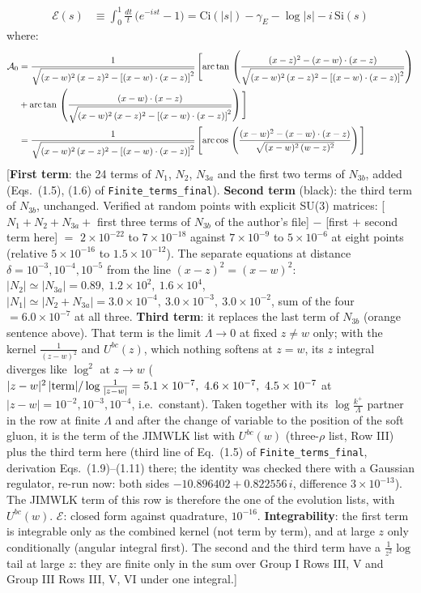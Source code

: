 \documentclass[10pt]{article}
\begin{document}
{\begin{align*}
\mathcal{E}(s) & \equiv\int_{0}^{1}\frac{dt}{t}\,\big(e^{-ist}-1\big)=\mathrm{Ci}(|s|)-\gamma_{E}-\log|s|-i\,\mathrm{Si}(s)
\end{align*}
where: \begin{align*}
\mathcal{A}_{0} & = \frac{1}{\sqrt{(x-w)^{2}\,(x-z)^{2}-\left[(x-w)\cdot (x-z)\right]^{2}}}\, \Bigg[\mathrm{arc\,tan}\,\left(\frac{(x-z)^{2}-(x-w)\cdot (x-z)}{\sqrt{(x-w)^{2}\,(x-z)^{2}-\left[(x-w)\cdot (x-z)\right]^{2}}}\right)\notag \\ & + \mathrm{arc\,tan}\,\left(\frac{(x-w)\cdot (x-z)}{\sqrt{(x-w)^{2}\,(x-z)^{2}-\left[(x-w)\cdot (x-z)\right]^{2}}}\right) \Bigg]\notag \\ & = \frac{1}{\sqrt{(x-w)^{2}\,(x-z)^{2}-\left[(x-w)\cdot (x-z)\right]^{2}}}\, \Bigg[\mathrm{arc\,cos}\,\left(\frac{(x-w)^{2}-(x-w)\cdot (x-z)}{\sqrt{(x-w)^{2}\,(w-z)^{2}}}\right)\Bigg]
\end{align*} [\textbf{First term}: the 24 terms of $N_{1}$, $N_{2}$, $N_{3a}$ and the first two terms of $N_{3b}$, added (Eqs.~(1.5), (1.6) of \texttt{Finite\_terms\_final}). \textbf{Second term} (black): the third term of $N_{3b}$, unchanged. Verified at random points with explicit SU(3) matrices: [$N_{1}+N_{2}+N_{3a}+$ first three terms of $N_{3b}$ of the author's file] $-$ [first $+$ second term here] $=$ $2\times10^{-22}$ to $7\times10^{-18}$ against $7\times10^{-9}$ to $5\times10^{-6}$ at eight points (relative $5\times10^{-16}$ to $1.5\times10^{-12}$). The separate equations at distance $\delta=10^{-3},10^{-4},10^{-5}$ from the line $(x-z)^{2}=(x-w)^{2}$: $|N_{2}|\simeq|N_{3a}|=0.89,\ 1.2\times10^{2},\ 1.6\times10^{4}$, $|N_{1}|\simeq|N_{2}+N_{3a}|=3.0\times10^{-4},\ 3.0\times10^{-3},\ 3.0\times10^{-2}$, sum of the four $=6.0\times10^{-7}$ at all three. \textbf{Third term}: it replaces the last term of $N_{3b}$ (orange sentence above). That term is the limit $\Lambda\to0$ at fixed $z\neq w$ only; with the kernel $\frac{1}{(z-w)^{2}}$ and $U^{bc}(z)$, which nothing softens at $z=w$, its $z$ integral diverges like $\log^{2}$ at $z\to w$ ($|z-w|^{2}\,|{\rm term}|/\log\frac{1}{|z-w|}=5.1\times10^{-7},\ 4.6\times10^{-7},\ 4.5\times10^{-7}$ at $|z-w|=10^{-2},10^{-3},10^{-4}$, i.e.\ constant). Taken together with its $\log\frac{k^{+}}{\Lambda}$ partner in the row at finite $\Lambda$ and after the change of variable to the position of the soft gluon, it is the term of the JIMWLK list with $U^{bc}(w)$ (three-$\rho$ list, Row III) plus the third term here (third line of Eq.~(1.5) of \texttt{Finite\_terms\_final}, derivation Eqs.~(1.9)--(1.11) there; the identity was checked there with a Gaussian regulator, re-run now: both sides $-10.896402+0.822556\,i$, difference $3\times10^{-13}$). The JIMWLK term of this row is therefore the one of the evolution lists, with $U^{bc}(w)$. $\mathcal{E}$: closed form against quadrature, $10^{-16}$. \textbf{Integrability}: the first term is integrable only as the combined kernel (not term by term), and at large $z$ only conditionally (angular integral first). The second and the third term have a $\frac{1}{z^{2}}\log$ tail at large $z$: they are finite only in the sum over Group I Rows III, V and Group III Rows III, V, VI under one integral.]\par\noindent}\par
\end{document}
